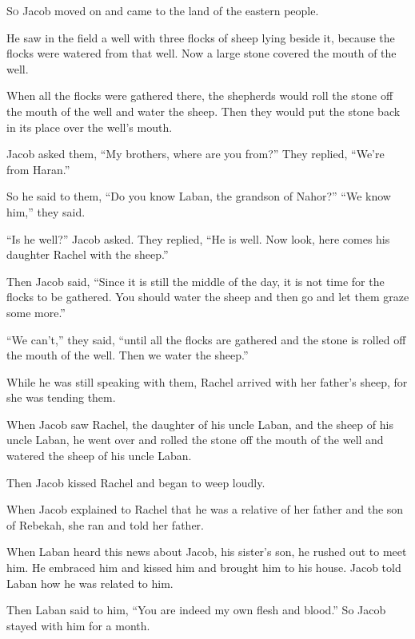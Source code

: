 \begin{scripture}
 \allowchapbreak\hypertarget{ch-genesis-29}{}\lettrine[lines=5]{\color{pentateuch}S}{\textsc{o}} Jacob moved on and came to the land of the eastern people.\everypar{}
 He saw in the field a well with three flocks of sheep lying beside it, because the flocks were watered from that well. Now a large stone covered the mouth of the well.
 When all the flocks were gathered there, the shepherds would roll the stone off the mouth of the well and water the sheep. Then they would put the stone back in its place over the well's mouth.
\everypar{}

 Jacob asked them, ``My brothers, where are you from?'' They replied, ``We're from Haran.''
 So he said to them, ``Do you know Laban, the grandson of Nahor?'' ``We know him,'' they said.
 ``Is he well?'' Jacob asked. They replied, ``He is well. Now look, here comes his daughter Rachel with the sheep.''
 Then Jacob said, ``Since it is still the middle of the day, it is not time for the flocks to be gathered. You should water the sheep and then go and let them graze some more.''
 ``We can't,'' they said, ``until all the flocks are gathered and the stone is rolled off the mouth of the well. Then we water the sheep.''
\everypar{}

 While he was still speaking with them, Rachel arrived with her father's sheep, for she was tending them.
 When Jacob saw Rachel, the daughter of his uncle Laban, and the sheep of his uncle Laban, he went over and rolled the stone off the mouth of the well and watered the sheep of his uncle Laban.
 Then Jacob kissed Rachel and began to weep loudly.
 When Jacob explained to Rachel that he was a relative of her father and the son of Rebekah, she ran and told her father.
 When Laban heard this news about Jacob, his sister's son, he rushed out to meet him. He embraced him and kissed him and brought him to his house. Jacob told Laban how he was related to him.
 Then Laban said to him, ``You are indeed my own flesh and blood.'' So Jacob stayed with him for a month.
\everypar{}


\end{scripture}
